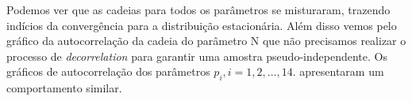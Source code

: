 \documentclass[a4paper,12pt,twoside]{article}
\begin{document}
\newpage
\begin{figure}[H]
  \centering
  \captionsetup{font=footnotesize,width=15cm}
  \caption{\small }
\end{figure}

Podemos ver que as cadeias para todos os parâmetros se misturaram, trazendo indícios da convergência para a distribuição estacionária. Além disso vemos pelo gráfico da autocorrelação da cadeia do parâmetro N que não precisamos realizar o processo de \textit{decorrelation} para garantir uma amostra pseudo-independente. Os gráficos de autocorrelação dos parâmetros $p_i,i=1,2,...,14.$ apresentaram um comportamento similar.
\end{document}

